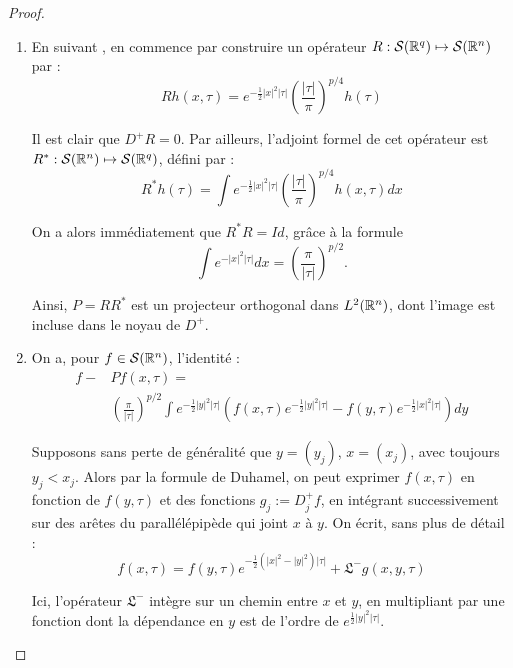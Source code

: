 \begin{proof}
\begin{enumerate}
  \item En suivant \cite{BoutetdeMonvel1975}, en commence par construire un opérateur $R : \mathcal{S}(\mathbb{R}^q) \mapsto \mathcal{S}(\mathbb{R}^n)$ par :
  \begin{equation*}
    Rh(x,\tau) = e^{-\frac 12 |x|^2 |\tau|}\left(\frac{|\tau|}{\pi}\right)^{p/4}h(\tau)
  \end{equation*}
  
  Il est clair que $D^+R=0$. Par ailleurs, l'adjoint formel de cet opérateur est $R^* : \mathcal{S}(\mathbb{R}^n) \mapsto \mathcal{S}(\mathbb{R}^q)$, défini par :
  \begin{equation*}
    R^*h(\tau) = \int e^{-\frac 12 |x|^2 |\tau|}\left(\frac{|\tau|}{\pi}\right)^{p/4}h(x,\tau)dx
  \end{equation*}
  
  On a alors immédiatement que $R^*R=Id$, grâce à la formule
  \begin{equation*}
    \int e^{-|x|^2|\tau|}dx = \left(\frac{\pi}{|\tau|}\right)^{p/2}.
  \end{equation*}
  
   Ainsi, $P=RR^*$ est un projecteur orthogonal dans $L^2(\mathbb{R}^n)$, dont l'image est incluse dans le noyau de $D^+$.
  
  \item On a, pour $f \in \mathcal{S}(\mathbb{R}^n)$, l'identité :
  \begin{equation*}
  \begin{split}
    f-&Pf(x,\tau) = \\ &\left(\frac{\pi}{|\tau|}\right)^{p/2}\int e^{-\frac 12 |y|^2 |\tau|}\left(f(x,\tau)e^{-\frac 12 |y|^2|\tau|} - f(y,\tau)e^{-\frac 12 |x|^2|\tau|}\right)dy
    \end{split}
  \end{equation*}
  
  Supposons sans perte de généralité que $y=(y_j)$, $x=(x_j)$, avec toujours $y_j < x_j$. Alors par la formule de Duhamel, on peut exprimer $f(x,\tau)$ en fonction de $f(y,\tau)$ et des fonctions $g_j := D^+_j f$, en intégrant successivement sur des arêtes du parallélépipède qui joint $x$ à $y$. On écrit, sans plus de détail :
  \begin{equation*}
    f(x,\tau)=f(y,\tau)e^{-\frac 12 (|x|^2-|y|^2)|\tau|} + \mathfrak{L}^- g (x,y,\tau)
  \end{equation*}
  
  Ici, l'opérateur $\mathfrak{L}^-$ intègre sur un chemin entre $x$ et $y$, en multipliant par une fonction dont la dépendance en $y$ est de l'ordre de $e^{\frac 12 |y|^2|\tau|}$.
  

\end{enumerate}
\end{proof}
